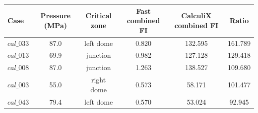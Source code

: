 \begin{tabular}{lccccc}
\toprule
Case & Pressure (MPa) & Critical zone & Fast combined FI & CalculiX combined FI & Ratio \\
\midrule
\(cal\_033\) & 87.0 & left dome & 0.820 & 132.595 & 161.789 \\
\(cal\_013\) & 69.9 & junction & 0.982 & 127.128 & 129.418 \\
\(cal\_008\) & 87.0 & junction & 1.263 & 138.527 & 109.680 \\
\(cal\_003\) & 55.0 & right dome & 0.573 & 58.171 & 101.477 \\
\(cal\_043\) & 79.4 & left dome & 0.570 & 53.024 & 92.945 \\
\bottomrule
\end{tabular}
